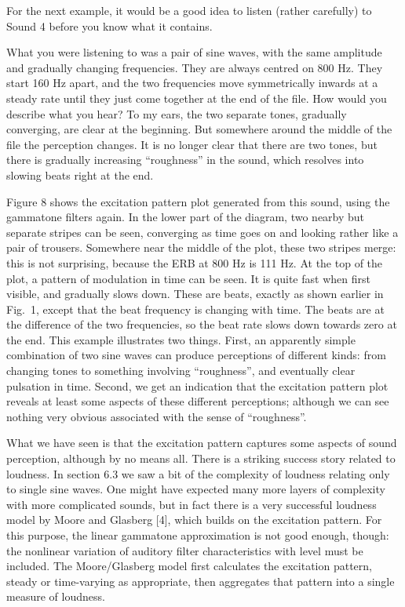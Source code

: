   For the next example, it would be a good idea to listen (rather carefully) to 
  Sound 4 before you know what it contains. 

  What you were listening to was a pair of sine waves, with the same amplitude 
  and gradually changing frequencies. They are always centred on 800 Hz. They 
  start 160 Hz apart, and the two frequencies move symmetrically inwards at a 
  steady rate until they just come together at the end of the file. How would 
  you describe what you hear? To my ears, the two separate tones, gradually 
  converging, are clear at the beginning. But somewhere around the middle of 
  the file the perception changes. It is no longer clear that there are two 
  tones, but there is gradually increasing ``roughness'' in the sound, which 
  resolves into slowing beats right at the end. 

  Figure 8 shows the excitation pattern plot generated from this sound, using 
  the gammatone filters again. In the lower part of the diagram, two nearby but 
  separate stripes can be seen, converging as time goes on and looking rather 
  like a pair of trousers. Somewhere near the middle of the plot, these two 
  stripes merge: this is not surprising, because the ERB at 800 Hz is 111 Hz. 
  At the top of the plot, a pattern of modulation in time can be seen. It is 
  quite fast when first visible, and gradually slows down. These are beats, 
  exactly as shown earlier in Fig.\ 1, except that the beat frequency is 
  changing with time. The beats are at the difference of the two frequencies, 
  so the beat rate slows down towards zero at the end. This example illustrates 
  two things. First, an apparently simple combination of two sine waves can 
  produce perceptions of different kinds: from changing tones to something 
  involving ``roughness'', and eventually clear pulsation in time. Second, we 
  get an indication that the excitation pattern plot reveals at least some 
  aspects of these different perceptions; although we can see nothing very 
  obvious associated with the sense of ``roughness''. 

  What we have seen is that the excitation pattern captures some aspects of 
  sound perception, although by no means all. There is a striking success story 
  related to loudness. In section 6.3 we saw a bit of the complexity of 
  loudness relating only to single sine waves. One might have expected many 
  more layers of complexity with more complicated sounds, but in fact there is 
  a very successful loudness model by Moore and Glasberg [4], which builds on 
  the excitation pattern. For this purpose, the linear gammatone approximation 
  is not good enough, though: the nonlinear variation of auditory filter 
  characteristics with level must be included. The Moore/Glasberg model first 
  calculates the excitation pattern, steady or time-varying as appropriate, 
  then aggregates that pattern into a single measure of loudness. 

